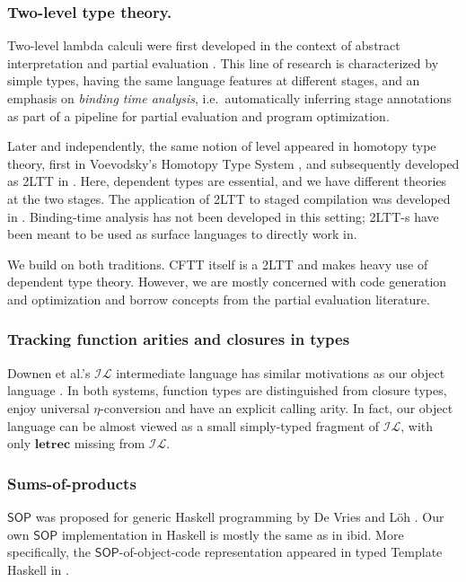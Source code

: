 \documentclass[acmsmall,screen,review,anonymous]{acmart}
\newcommand{\msf}[1]{{\mathsf{#1}}}
\newcommand{\mbf}[1]{{\mathbf{#1}}}
\newcommand{\SOP}{\msf{SOP}}
\theoremstyle{remark}
\begin{document}
\subsubsection*{Two-level type theory.} Two-level lambda calculi were first developed in
the context of abstract interpretation and partial evaluation
\cite{DBLP:phd/ethos/Nielson84a,DBLP:books/daglib/0071307}.  This line of
research is characterized by simple types, having the same language features at
different stages, and an emphasis on \emph{binding time analysis},
i.e.\ automatically inferring stage annotations as part of a pipeline for
partial evaluation and program optimization.

Later and independently, the same notion of level appeared in homotopy type
theory, first in Voevodsky's Homotopy Type System \cite{hts}, and subsequently developed as
2LTT in \cite{twolevel}. Here, dependent types are essential, and we have different
theories at the two stages. The application of 2LTT to staged compilation was
developed in \cite{staged2ltt}. Binding-time analysis has not been developed in this
setting; 2LTT-s have been meant to be used as surface languages to directly work
in.

We build on both traditions. CFTT itself is a 2LTT and makes heavy use of
dependent type theory. However, we are mostly concerned with code generation and
optimization and borrow concepts from the partial evaluation literature.

\subsubsection*{Tracking function arities and closures in types} Downen et al.'s
$\mathcal{IL}$ intermediate language has similar motivations as our object
language \cite{DBLP:journals/pacmpl/DownenAJE20}. In both systems, function
types are distinguished from closure types, enjoy universal $\eta$-conversion
and have an explicit calling arity. In fact, our object language can be almost
viewed as a small simply-typed fragment of $\mathcal{IL}$, with only
$\mbf{letrec}$ missing from $\mathcal{IL}$.

\subsubsection*{Sums-of-products} $\SOP$ was proposed for generic Haskell programming
by De Vries and Löh \cite{DBLP:conf/icfp/VriesL14}. Our own $\SOP$ implementation in Haskell is
mostly the same as in ibid. More specifically, the $\SOP$-of-object-code
representation appeared in typed Template Haskell in \cite{DBLP:conf/haskell/PickeringLW20}.
\end{document}
